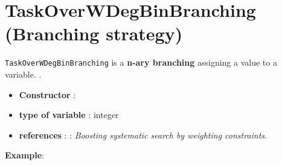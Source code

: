 \section{TaskOverWDegBinBranching (Branching strategy)}\label{taskdomoverwdeg:taskdomoverwdegbranchstrat}\hypertarget{taskdomoverwdeg:taskdomoverwdegbranchstrat}{}
\begin{notedef}
  \texttt{TaskOverWDegBinBranching} is a \textbf{n-ary branching} assigning a value to a variable. .
\end{notedef}

\begin{itemize}
	\item \textbf{Constructor} :
	\item \textbf{type of variable} : integer
	\item \textbf{references} : \cite{Boussemart04}: \emph{Boosting systematic search by weighting constraints}.
\end{itemize}

\textbf{Example}:
%

